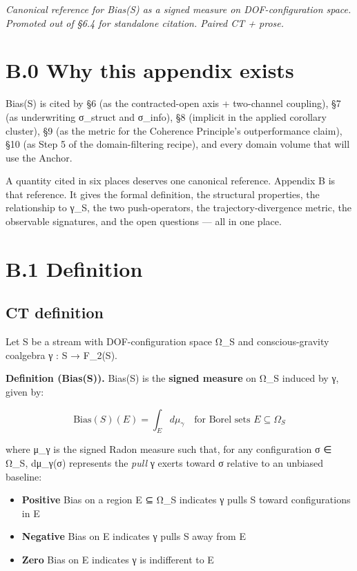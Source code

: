 \documentclass[11pt, openany]{book}
\newcommand{\sectionbreak}{\clearpage}
\begin{document}
\textit{Canonical reference for Bias(S) as a signed measure on DOF-configuration space. Promoted out of §6.4 for standalone citation. Paired CT + prose.}

\sectionbreak

\section{B.0 Why this appendix exists}

Bias(S) is cited by §6 (as the contracted-open axis + two-channel coupling), §7 (as underwriting σ\_\allowbreak{}struct and σ\_\allowbreak{}info), §8 (implicit in the applied corollary cluster), §9 (as the metric for the Coherence Principle's outperformance claim), §10 (as Step 5 of the domain-filtering recipe), and every domain volume that will use the Anchor.

A quantity cited in six places deserves one canonical reference. Appendix B is that reference. It gives the formal definition, the structural properties, the relationship to γ\_\allowbreak{}S, the two push-operators, the trajectory-divergence metric, the observable signatures, and the open questions --- all in one place.

\sectionbreak

\section{B.1 Definition}

\subsection{CT definition}

Let S be a stream with DOF-configuration space Ω\_\allowbreak{}S and conscious-gravity coalgebra γ : S → F\_\allowbreak{}2(S).

\textbf{Definition (Bias(S)).} Bias(S) is the \textbf{signed measure} on Ω\_\allowbreak{}S induced by γ, given by:

$$\text{Bias}(S)(E) = \int_E d\mu_\gamma \quad \text{for Borel sets } E \subseteq \Omega_S$$

where μ\_\allowbreak{}γ is the signed Radon measure such that, for any configuration σ ∈ Ω\_\allowbreak{}S, dμ\_\allowbreak{}γ(σ) represents the \textit{pull} γ exerts toward σ relative to an unbiased baseline:

\begin{itemize}
\item \textbf{Positive} Bias on a region E ⊆ Ω\_\allowbreak{}S indicates γ pulls S toward configurations in E
\item \textbf{Negative} Bias on E indicates γ pulls S away from E
\item \textbf{Zero} Bias on E indicates γ is indifferent to E
\end{itemize}
\end{document}
